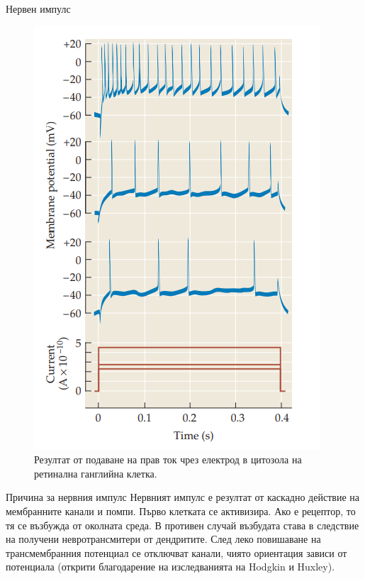 \begin{frame}[t]{Нервен импулс}
  \begin{figure}[htbp!]
    \centering
    \includegraphics[width=\textwidth,height=0.7\textheight,keepaspectratio]{ac-current.PNG}
    \caption{Резултат от подаване на прав ток чрез електрод в цитозола на ретинална ганглийна клетка. \cite[Фиг 1.12]{Neuron}}
  \end{figure}
\end{frame}

\begin{frame}[t]{Причина за нервния импулс}
  Нервният импулс е резултат от каскадно действие на мембранните канали и помпи.
  Първо клетката се активизира. 
  Ако е рецептор, то тя се възбужда от околната среда.
  В противен случай възбудата става в следствие на получени невротрансмитери от дендритите.  
  След леко повишаване на трансмембранния потенциал се отключват  канали, чиято ориентация зависи от потенциала (открити благодарение на изследванията на Hodgkin и Huxley).
\end{frame}

